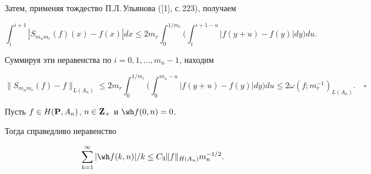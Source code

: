 Затем, применяя тождество П.Л.\,Ульянова ([1], с.\,223), получаем


$$


\int^{i+1}_i|S_{m_nm_r}(f)(x)-f(x)|dx\leq


2m_r\int^{1/m_r}_0\bigg(\int^{i+1-u}_i|f(y+u)-f(y)|dy\bigg)du.


$$


Суммируя эти неравенства по $i=0,1,\dotsc,m_n-1$, находим


$$


\|S_{m_nm_r}(f)-f\|_{L(A_n)}\leq 2m_r\int^{1/m_r}_0


\bigg(\int^{m_n-u}_0|f(y+u)-f(y)|dy\bigg)du\leq


2\omega(f;m_r^{-1})_{L(A_n)}.\quad\square


$$








\begin{lems}


Пусть $f\in H({\bold P}, A_n)$, $n\in {\bold Z}_+$ и ${\wh f}(0,n)=0$.


Тогда справедливо неравенство


$$


\sum^{\infty}_{k=1}|{\wh f}(k,n)|/k\leq C_3\|f\|_{H(A_n)}m_n^{-1/2}.


$$


\end{lems}








